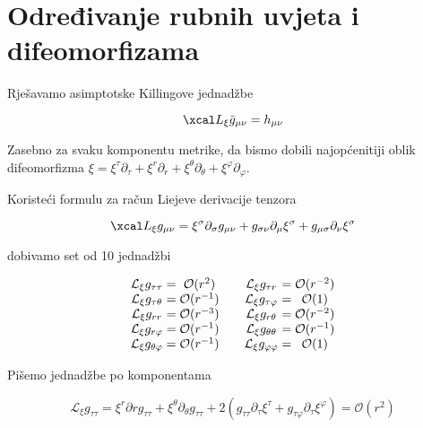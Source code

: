 \chapter{Određivanje rubnih uvjeta i difeomorfizama}\label{cha:IzvodDiff}

Rješavamo asimptotske Killingove jednadžbe

\begin{equation}
\Lie_\xi\bar{g}_{\mu\nu}=h_{\mu\nu}
\end{equation}

\noindent Zasebno za svaku komponentu metrike, da bismo dobili najopćenitiji oblik difeomorfizma $\xi=\xi^\tau \partial_\tau+\xi^r\partial_r+\xi^\theta\partial_\theta+\xi^\varphi\partial_\varphi$.

\noindent Koristeći formulu za račun Liejeve derivacije tenzora

\begin{equation}
\Lie_\xi g_{\mu\nu}=\xi^\sigma\partial_\sigma g_{\mu\nu}+g_{\sigma\nu}\partial_\mu\xi^\sigma+g_{\mu\sigma}\partial_\nu\xi^\sigma
\end{equation}

\noindent dobivamo set od 10 jednadžbi


\begin{equation}
\begin{array}{c @{{}={}} c @{\qquad} c @{{}={}} c}
\mathcal{L}_\xi g_{\tau\tau} & \mathcal{O}(r^2) & \mathcal{L}_\xi g_{\tau r} & \mathcal{O}(r^{-2}) \\
\mathcal{L}_\xi g_{\tau\theta} & \mathcal{O}(r^{-1}) & \mathcal{L}_\xi g_{\tau\varphi} & \mathcal{O}(1) \\
\mathcal{L}_\xi g_{rr} & \mathcal{O}(r^{-3}) & \mathcal{L}_\xi g_{r\theta} & \mathcal{O}(r^{-2}) \\
\mathcal{L}_\xi g_{r\varphi} & \mathcal{O}(r^{-1}) & \mathcal{L}_\xi g_{\theta\theta} & \mathcal{O}(r^{-1}) \\
\mathcal{L}_\xi g_{\theta\varphi} & \mathcal{O}(r^{-1}) & \mathcal{L}_\xi g_{\varphi\varphi} & \mathcal{O}(1) \\
\end{array}
\end{equation}

\noindent Pišemo jednadžbe po komponentama

\begin{equation}
\mathcal{L}_\xi g_{\tau\tau}=\xi^r\partial{r} g_{\tau\tau}+\xi^\theta\partial_{\theta} g_{\tau\tau}+2(g_{\tau\tau}\partial_{\tau}\xi^\tau+g_{\tau\varphi}\partial_{\tau}\xi^\varphi)=\mathcal{O}(r^2)
\label{eq:ttjed}
\end{equation}

